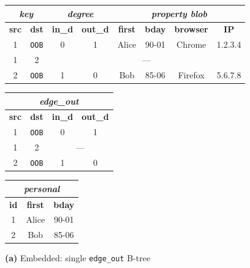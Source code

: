 \begin{figure}[t]
  \centering
  {\setlength{\arrayrulewidth}{0.5pt}%

  \begin{minipage}[t]{0.40\textwidth}
    \centering
    \footnotesize
    \begin{tabular}{|c|c|c|c|c|c|c|c|}
      \hline
      \multicolumn{2}{|c|}{\textit{key}} & \multicolumn{2}{c|}{\textit{degree}} & \multicolumn{4}{c|}{\textit{property blob}} \\
      \hline
      \textbf{src} & \textbf{dst} & \textbf{in\_d} & \textbf{out\_d} & \textbf{first} & \textbf{bday} & \textbf{browser} & \textbf{IP} \\
      \hline
      \rowcolor{gray!15} 1 & \texttt{OOB} & 0 & 1 & Alice & 90-01 & Chrome & 1.2.3.4 \\
      1 & 2 & \multicolumn{6}{c|}{---} \\
      \rowcolor{gray!15} 2 & \texttt{OOB} & 1 & 0 & Bob & 85-06 & Firefox & 5.6.7.8 \\
      \hline
    \end{tabular}
    \caption*{\textbf{(a)} Embedded: single \texttt{edge\_out} B-tree}
  \end{minipage}%
  \hfill
  \begin{minipage}[t]{0.57\textwidth}
    \centering
    \footnotesize
    \begin{tabular}{|c|c|c|c|}
      \hline
      \multicolumn{4}{|c|}{\textit{edge\_out}} \\
      \hline
      \textbf{src} & \textbf{dst} & \textbf{in\_d} & \textbf{out\_d} \\
      \hline
      \rowcolor{gray!15} 1 & \texttt{OOB} & 0 & 1 \\
      1 & 2 & \multicolumn{2}{c|}{---} \\
      \rowcolor{gray!15} 2 & \texttt{OOB} & 1 & 0 \\
      \hline
    \end{tabular}%
    \quad
    \begin{tabular}{|c|c|c|}
      \hline
      \multicolumn{3}{|c|}{\cellcolor{blue!12}\textit{personal}} \\
      \hline
      \textbf{id} & \textbf{first} & \textbf{bday} \\
      \hline
      \rowcolor{blue!12} 1 & Alice & 90-01 \\
      \rowcolor{blue!12} 2 & Bob & 85-06 \\

\end{tabular}
\end{minipage}}
\end{figure}
